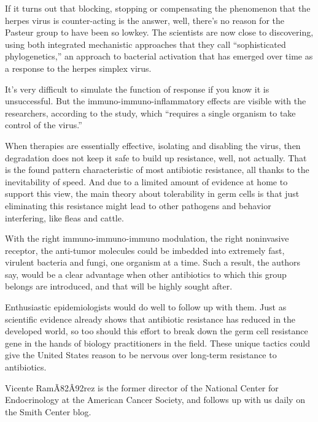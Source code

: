 \documentclass{article}
\begin{document}
If it turns out that blocking, stopping or compensating the phenomenon that the herpes virus is counter-acting is the answer, well, there’s no reason for the Pasteur group to have been so lowkey. The scientists are now close to discovering, using both integrated mechanistic approaches that they call “sophisticated phylogenetics,” an approach to bacterial activation that has emerged over time as a response to the herpes simplex virus.

It’s very difficult to simulate the function of response if you know it is unsuccessful. But the immuno-immuno-inflammatory effects are visible with the researchers, according to the study, which “requires a single organism to take control of the virus.”

When therapies are essentially effective, isolating and disabling the virus, then degradation does not keep it safe to build up resistance, well, not actually. That is the found pattern characteristic of most antibiotic resistance, all thanks to the inevitability of speed. And due to a limited amount of evidence at home to support this view, the main theory about tolerability in germ cells is that just eliminating this resistance might lead to other pathogens and behavior interfering, like fleas and cattle.

With the right immuno-immuno-immuno modulation, the right noninvasive receptor, the anti-tumor molecules could be imbedded into extremely fast, virulent bacteria and fungi, one organism at a time. Such a result, the authors say, would be a clear advantage when other antibiotics to which this group belongs are introduced, and that will be highly sought after.

Enthusiastic epidemiologists would do well to follow up with them. Just as scientific evidence already shows that antibiotic resistance has reduced in the developed world, so too should this effort to break down the germ cell resistance gene in the hands of biology practitioners in the field. These unique tactics could give the United States reason to be nervous over long-term resistance to antibiotics.

Vicente RamÃ\x82Â\x92rez is the former director of the National Center for Endocrinology at the American Cancer Society, and follows up with us daily on the Smith Center blog.
\end{document}
